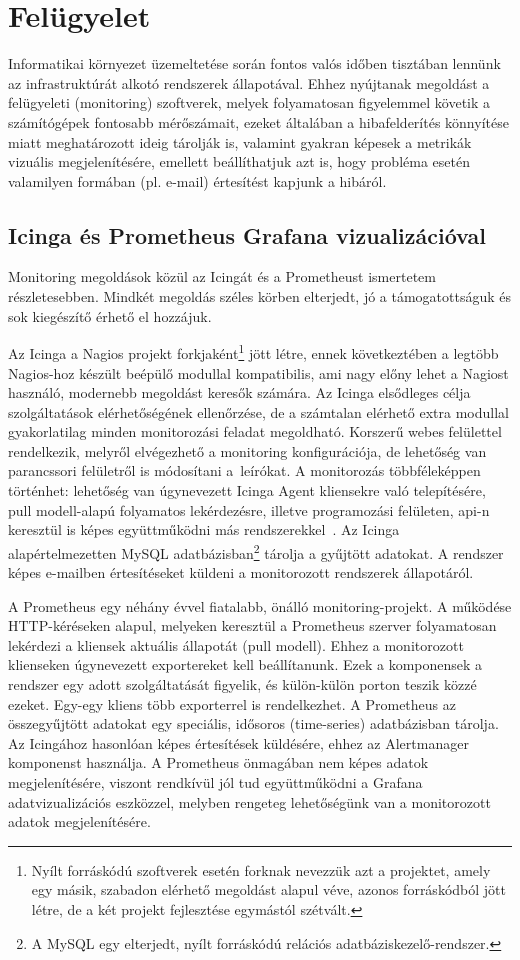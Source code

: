 \section{Felügyelet}
\label{sect:monitoring}
Informatikai környezet üzemeltetése során fontos valós időben tisztában lennünk az infrastruktúrát alkotó rendszerek állapotával. Ehhez nyújtanak megoldást a felügyeleti (monitoring) szoftverek, melyek folyamatosan figyelemmel követik a számítógépek fontosabb mérőszámait, ezeket általában a hibafelderítés könnyítése miatt meghatározott ideig tárolják is, valamint gyakran képesek a metrikák vizuális megjelenítésére, emellett beállíthatjuk azt is, hogy probléma esetén valamilyen formában (pl. e-mail) értesítést kapjunk a hibáról.

\subsection{Icinga és Prometheus Grafana vizualizációval}
Monitoring megoldások közül az Icingát és a Prometheust ismertetem részletesebben. Mindkét megoldás széles körben elterjedt, jó a támogatottságuk és sok kiegészítő érhető el hozzájuk.

Az Icinga a Nagios projekt forkjaként\footnote{Nyílt forráskódú szoftverek esetén forknak nevezzük azt a projektet, amely egy másik, szabadon elérhető megoldást alapul véve, azonos forráskódból jött létre, de a két projekt fejlesztése egymástól szétvált.} jött létre, ennek következtében a legtöbb Nagios-hoz készült beépülő modullal kompatibilis, ami nagy előny lehet a Nagiost használó, modernebb megoldást keresők számára. Az Icinga elsődleges célja szolgáltatások elérhetőségének ellenőrzése, de a számtalan elérhető extra modullal gyakorlatilag minden monitorozási feladat megoldható. Korszerű webes felülettel rendelkezik, melyről elvégezhető a monitoring konfigurációja, de lehetőség van parancssori felületről is módosítani a~leírókat. A monitorozás többféleképpen történhet: lehetőség van úgynevezett Icinga Agent kliensekre való telepítésére, pull modell-alapú folyamatos lekérdezésre, illetve programozási felületen, \acrshort{api}-n keresztül is képes együttműködni más rendszerekkel~\cite{IcingaApi}. Az Icinga alapértelmezetten MySQL adatbázisban\footnote{A MySQL egy elterjedt, nyílt forráskódú relációs adatbáziskezelő-rendszer.} tárolja a gyűjtött adatokat. A rendszer képes e-mailben értesítéseket küldeni a monitorozott rendszerek állapotáról.

A Prometheus egy néhány évvel fiatalabb, önálló monitoring-projekt. A működése HTTP-kéréseken alapul, melyeken keresztül a Prometheus szerver folyamatosan lekérdezi a kliensek aktuális állapotát (pull modell). Ehhez a monitorozott klienseken úgynevezett exportereket kell beállítanunk. Ezek a komponensek a rendszer egy adott szolgáltatását figyelik, és külön-külön porton teszik közzé ezeket. Egy-egy kliens több exporterrel is rendelkezhet. A Prometheus az összegyűjtött adatokat egy speciális, idősoros (time-series) adatbázisban tárolja. Az Icingához hasonlóan képes értesítések küldésére, ehhez az Alertmanager komponenst használja. A Prometheus önmagában nem képes adatok megjelenítésére, viszont rendkívül jól tud együttműködni a Grafana adatvizualizációs eszközzel, melyben rengeteg lehetőségünk van a monitorozott adatok megjelenítésére.